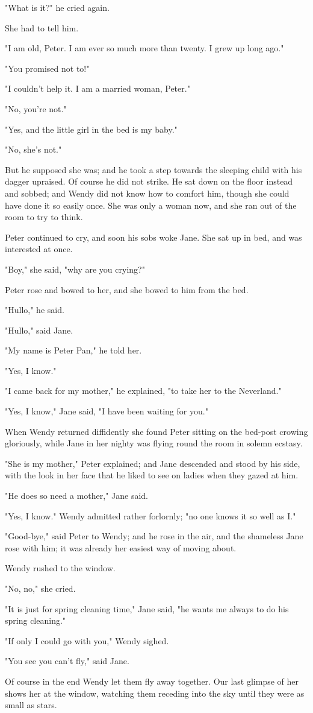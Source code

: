 "What is it?\@" he cried again.

She had to tell him.

"I am old, Peter.
I am ever so much more than twenty.
I grew up long ago."

"You promised not to!"

"I couldn't help it.
I am a married woman, Peter."

"No, you're not."

"Yes, and the little girl in the bed is my baby."

"No, she's not."

But he supposed she was;
and he took a step towards the sleeping child with his dagger upraised.
Of course he did not strike.
He sat down on the floor instead and sobbed;
and Wendy did not know how to comfort him, though she could have done it so easily once.
She was only a woman now, and she ran out of the room to try to think.

Peter continued to cry, and soon his sobs woke Jane.
She sat up in bed, and was interested at once.

"Boy," she said, "why are you crying?"

Peter rose and bowed to her, and she bowed to him from the bed.

"Hullo," he said.

"Hullo," said Jane.

"My name is Peter Pan," he told her.

"Yes, I know."

"I came back for my mother," he explained, "to take her to the Neverland."

"Yes, I know," Jane said, "I have been waiting for you."

When Wendy returned diffidently she found Peter sitting on the bed-post crowing gloriously, while Jane in her nighty was flying round the room in solemn ecstasy.

"She is my mother," Peter explained;
and Jane descended and stood by his side, with the look in her face that he liked to see on ladies when they gazed at him.

"He does so need a mother," Jane said.

"Yes, I know."
Wendy admitted rather forlornly;
"no one knows it so well as I\@."

"Good-bye," said Peter to Wendy;
and he rose in the air, and the shameless Jane rose with him;
it was already her easiest way of moving about.

Wendy rushed to the window.

"No, no," she cried.

"It is just for spring cleaning time," Jane said, "he wants me always to do his spring cleaning."

"If only I could go with you," Wendy sighed.

"You see you can't fly," said Jane.

Of course in the end Wendy let them fly away together.
Our last glimpse of her shows her at the window, watching them receding into the sky until they were as small as stars.
